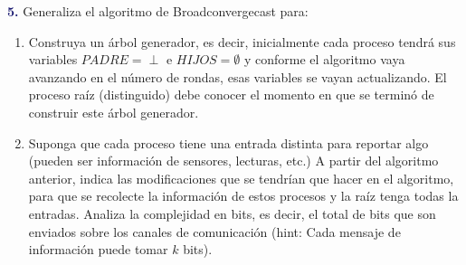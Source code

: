 \newpage
\textbf{\textcolor{MidnightBlue}{5.}}
Generaliza el algoritmo de Broadconvergecast para:
\begin{enumerate}
\item Construya un árbol generador, es decir,
inicialmente cada proceso tendrá sus variables
$PADRE = \perp$ e $HIJOS = \emptyset$ y conforme
el algoritmo vaya avanzando en el número de
rondas, esas variables se vayan actualizando.
El proceso raíz (distinguido) debe conocer el
momento en que se terminó de construir este árbol generador.

\item Suponga que cada proceso tiene una entrada
distinta para reportar algo (pueden ser información
de sensores, lecturas, etc.) A partir del algoritmo
anterior, indica las modificaciones que se tendrían
que hacer en el algoritmo, para que se recolecte la
información de estos procesos y la raíz tenga todas
la entradas. Analiza la complejidad en bits, es decir,
el total de bits que son enviados sobre los canales de
comunicación (hint: Cada mensaje de información puede
tomar $k$ bits).
\end{enumerate}
